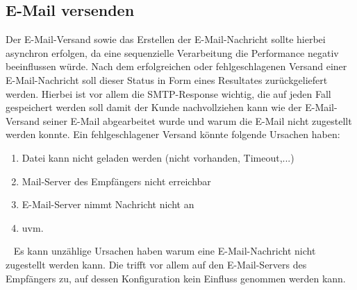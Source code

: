 \subsection{E-Mail versenden}
Der E-Mail-Versand sowie das Erstellen der E-Mail-Nachricht sollte hierbei asynchron erfolgen, da eine sequenzielle Verarbeitung die Performance negativ beeinflussen würde. Nach dem erfolgreichen oder fehlgeschlagenen Versand einer E-Mail-Nachricht soll dieser Status in Form eines Resultates zurückgeliefert werden. Hierbei ist vor allem die SMTP-Response wichtig, die auf jeden Fall gespeichert werden soll damit der Kunde nachvollziehen kann wie der E-Mail-Versand seiner E-Mail abgearbeitet wurde und warum die E-Mail nicht zugestellt werden konnte. Ein fehlgeschlagener Versand könnte folgende Ursachen haben:
\begin{enumerate}
	\item Datei kann nicht geladen werden (nicht vorhanden, Timeout,...)
	\item Mail-Server des Empfängers nicht erreichbar
	\item E-Mail-Server nimmt Nachricht nicht an
	\item uvm.
\end{enumerate}
\ \newline
Es kann unzählige Ursachen haben warum eine E-Mail-Nachricht nicht zugestellt werden kann. Die trifft vor allem auf den E-Mail-Servers des Empfängers zu, auf dessen Konfiguration kein Einfluss genommen werden kann.
\newpage
